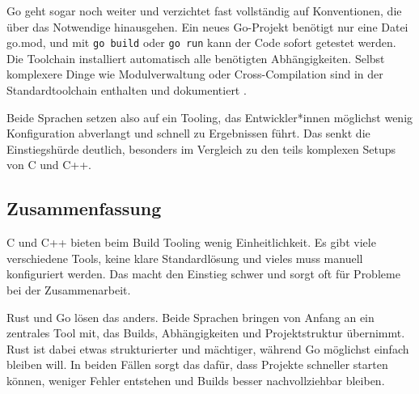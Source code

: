 Go geht sogar noch weiter und verzichtet fast vollständig auf Konventionen, die über das Notwendige hinausgehen. 
Ein neues Go-Projekt benötigt nur eine Datei go.mod, und mit \texttt{go build} oder \texttt{go run} kann der Code sofort getestet werden. 
Die Toolchain installiert automatisch alle benötigten Abhängigkeiten. Selbst komplexere Dinge wie Modulverwaltung 
oder Cross-Compilation sind in der Standardtoolchain enthalten und dokumentiert \autocite{UsingGoModules,UnderstandingGoModules}.

Beide Sprachen setzen also auf ein Tooling, das Entwickler*innen möglichst wenig Konfiguration abverlangt und schnell zu Ergebnissen führt. 
Das senkt die Einstiegshürde deutlich, besonders im Vergleich zu den teils komplexen Setups von C und C++.

\subsection{Zusammenfassung}
\label{subsec:Build_Tooling_Zusammenfassung}

C und C++ bieten beim Build Tooling wenig Einheitlichkeit. Es gibt viele verschiedene Tools, keine klare Standardlösung 
und vieles muss manuell konfiguriert werden. Das macht den Einstieg schwer und sorgt oft für Probleme bei der Zusammenarbeit.

Rust und Go lösen das anders. Beide Sprachen bringen von Anfang an ein zentrales Tool mit, das Builds, 
Abhängigkeiten und Projektstruktur übernimmt. Rust ist dabei etwas strukturierter und mächtiger, 
während Go möglichst einfach bleiben will. In beiden Fällen sorgt das dafür, dass Projekte schneller starten können, 
weniger Fehler entstehen und Builds besser nachvollziehbar bleiben.
